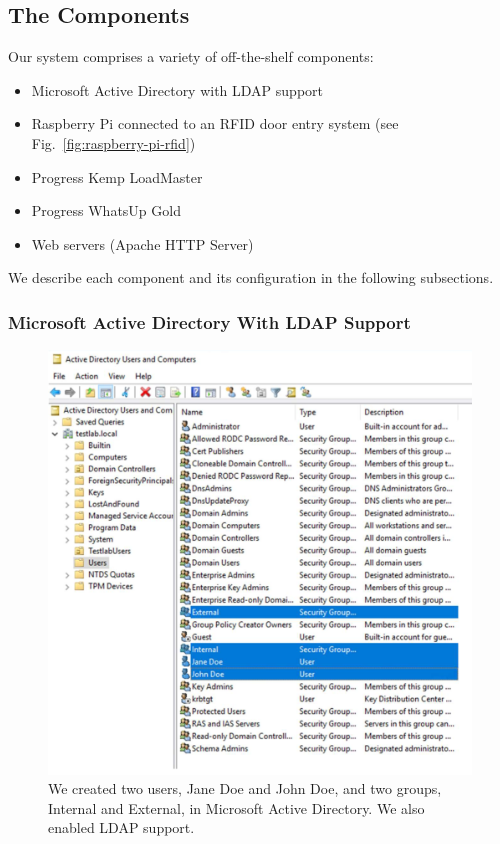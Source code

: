 \subsection{The Components}

Our system comprises a variety of off-the-shelf components:

\begin{itemize}
\item Microsoft Active Directory with LDAP support
\item Raspberry Pi connected to an RFID door entry system (see
  Fig.~\ref{fig:raspberry-pi-rfid})
\item Progress Kemp LoadMaster~\cite{progress-kemp-loadmaster-xx}
\item Progress WhatsUp Gold~\cite{progress-kemp-whatsup-gold-xx}
\item Web servers (Apache HTTP Server)
\end{itemize}

We describe each component and its configuration in the following
subsections.

\subsubsection{Microsoft Active Directory With LDAP Support}

\begin{figure}
  \centerline{\includegraphics[width=\columnwidth]{img/active-directory}}
  \caption{We created two users, Jane Doe and John Doe, and two
    groups, Internal and External, in Microsoft Active Directory.  We
    also enabled LDAP support.}\label{fig:active-directory}
\end{figure}

